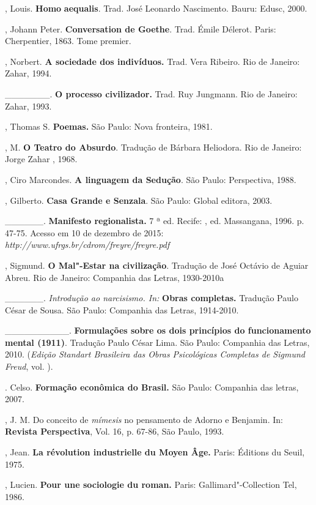 \begin{Parskip}
, Louis. \textbf{Homo} \textbf{aequalis}. Trad. José Leonardo
Nascimento. Bauru: Edusc, 2000.

, Johann Peter. \textbf{Conversation de Goethe}. Trad. Émile
Délerot. Paris: Cherpentier, 1863. Tome premier.

, Norbert. \textbf{A sociedade dos indivíduos.} Trad. Vera Ribeiro.
Rio de Janeiro: Zahar, 1994.

\_\_\_\_\_\_\_. \textbf{O processo civilizador.} Trad. Ruy Jungmann. Rio
de Janeiro: Zahar, 1993.

, Thomas S. \textbf{Poemas.} São Paulo: Nova fronteira, 1981.

, M. \textbf{O Teatro do Absurdo}. Tradução de Bárbara
Heliodora. Rio de Janeiro: Jorge Zahar , 1968.

, Ciro Marcondes. \textbf{A linguagem da Sedução}. São Paulo:
Perspectiva, 1988.

, Gilberto. \textbf{Casa Grande e Senzala}. São Paulo: Global
editora, 2003.

\_\_\_\_\_\_. \textbf{Manifesto regionalista.} 7 ª ed. Recife: ,
ed. Massangana, 1996. p. 47-75. Acesso em 10 de dezembro de 2015:
\emph{http://www.ufrgs.br/cdrom/freyre/freyre.pdf}

, Sigmund. \textbf{O Mal"-Estar na civilização}. Tradução de
José Octávio de Aguiar Abreu. Rio de Janeiro: Companhia das Letras,
1930-2010a

\_\_\_\_\_\_. \emph{Introdução ao narcisismo. In:} \textbf{Obras
completas.} Tradução Paulo César de Sousa. São Paulo: Companhia das
Letras, 1914-2010.

\_\_\_\_\_\_\_\_\_\_. \textbf{Formulações sobre os dois princípios do
funcionamento mental (1911)}. Tradução Paulo César Lima. São Paulo:
Companhia das Letras, 2010. (\emph{Edição Standart Brasileira das Obras
Psicológicas Completas de Sigmund Freud}, vol. ).

. Celso. \textbf{Formação econômica do Brasil.} São Paulo:
Companhia das letras, 2007.

, J. M. Do conceito de \emph{mímesis} no pensamento de Adorno e
Benjamin. In: \textbf{Revista Perspectiva}, Vol. 16, p. 67-86, São
Paulo, 1993.

, Jean. \textbf{La révolution industrielle du Moyen Âge.} Paris:
Éditions du Seuil, 1975.

, Lucien. \textbf{Pour une sociologie du roman.} Paris:
Gallimard"-Collection Tel, 1986.


\end{Parskip}
